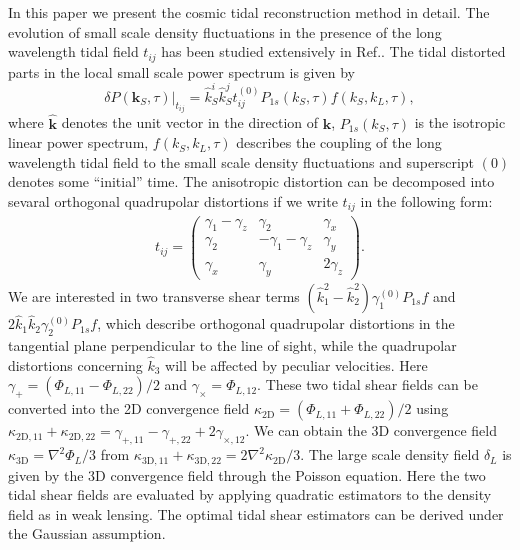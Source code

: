 \documentclass[aps,prd,twocolumn,showpacs,superscriptaddress,groupedaddress,nofootinbib]{revtex4}  %
\newcommand{\mr}{\mathrm}
\begin{document}
In this paper we present the cosmic tidal reconstruction method in detail. 
The evolution of small scale density fluctuations in the presence of the 
long wavelength tidal field $t_{ij}$ has been studied extensively in 
Ref.\cite{2014:tidal}.
The tidal distorted parts in the local small scale power spectrum is given by 
\begin{equation}
\delta P(\bm{k}_S,\tau)|_{t_{ij}}=
\hat{k}_S^i\hat{k}_S^jt_{ij}^{(0)}P_{1s}(k_S,\tau)f(k_S, k_L,\tau),
\end{equation}
where $\hat{\bm{k}}$ denotes the unit vector in the direction of $\bm{k}$,
$P_{1s}(k_S,\tau)$ is the isotropic linear power spectrum, 
$f(k_S, k_L, \tau)$ describes the coupling of the long wavelength tidal field 
to the small scale density fluctuations and superscript $(0)$ denotes some 
``initial'' time. 
The anisotropic distortion can be decomposed into sevaral orthogonal quadrupolar
distortions if we write $t_{ij}$ in the following form:
\begin{eqnarray}
t_{ij}=\left( \begin{array}{ccc}
\gamma_{1}-\gamma_{z} & \gamma_{2} & \gamma_{x}\\
\gamma_{2} & -\gamma_{1}-\gamma_{z} & \gamma_{y}\\
\gamma_{x} & \gamma_{y} & 2\gamma_z
\end{array} \right).
\end{eqnarray}
We are interested in two transverse shear terms 
$(\hat{k}_1^2-\hat{k}_2^2)\gamma_1^{(0)}P_{1s}f$
and $2\hat{k}_1\hat{k}_2\gamma_2^{(0)}P_{1s}f$, which 
describe orthogonal quadrupolar distortions in the tangential plane perpendicular 
to the line of sight, while the quadrupolar distortions concerning $\hat{k}_3$
will be affected by peculiar velocities.
Here $\gamma_{+}=(\Phi_{L,11}-\Phi_{L,22})/2$ and $\gamma_{\times}=\Phi_{L,12}$.
These two tidal shear fields can be converted into the 2D convergence field
$\kappa_\mr{2D}=(\Phi_{L,11}+\Phi_{L,22})/2$ 
using $\kappa_{\mr{2D},11}+\kappa_{\mr{2D},22}=
\gamma_{+,11}-\gamma_{+,22}+2\gamma_{\times,12}$.
We can obtain the 3D convergence field $\kappa_\mr{3D}=\nabla^2\Phi_L/3$ from 
$\kappa_\mr{3D,11}+\kappa_\mr{3D,22}=2\nabla^2\kappa_\mr{2D}/3$. 
The large scale density field $\delta_L$ is given by the 3D convergence field 
through the Poisson equation.
Here the two tidal shear fields are evaluated by applying
quadratic estimators to the density field as in weak lensing.
The optimal tidal shear estimators can be derived under the Gaussian assumption.
\end{document}

